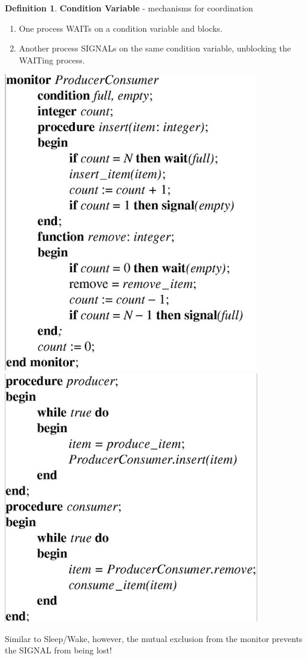 \documentclass[12pt,a4paper]{article}
\theoremstyle{definition}
\newtheorem{definition}{Definition}[section]
\newenvironment{myenumerate}
{ \begin{enumerate}
    \setlength{\itemsep}{5pt}
    \setlength{\parskip}{0pt}
    \setlength{\parsep}{0pt}     }
{ \end{enumerate}                }
\begin{document}
\begin{definition}{\textbf{Condition Variable} - mechanisms for coordination}
	\begin{myenumerate}
		\item One process WAITs on a condition variable and blocks.
		\item Another process SIGNALs on the same condition variable, unblocking the WAITing process.
	\end{myenumerate}
\end{definition}

\begin{tcolorbox}
	\includegraphics[scale=0.4]{m1/producerConsumerMonitor1}
	\includegraphics[scale=0.4]{m1/producerConsumerMonitor2}
	\centering	
	
	Similar to Sleep/Wake, however, the mutual exclusion from the monitor prevents the SIGNAL from being lost! 
\end{tcolorbox}
\end{document}

